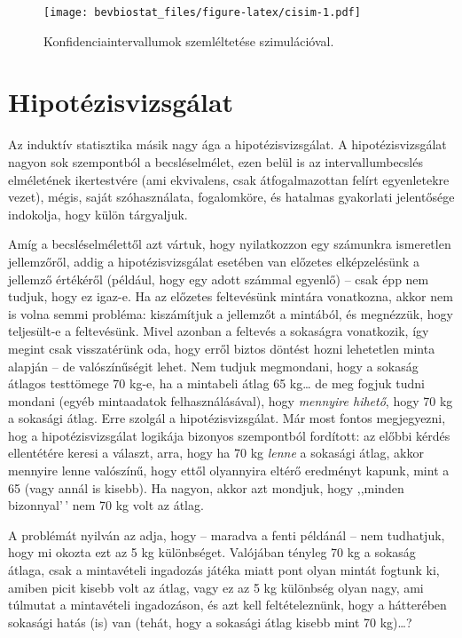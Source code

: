 \documentclass[
]{book}
\begin{document}
\begin{figure}
\centering
\texttt{[image: bevbiostat\_files/figure-latex/cisim-1.pdf]}
\caption{\label{fig:cisim}Konfidenciaintervallumok szemléltetése szimulációval.}
\end{figure}

\hypertarget{induktivhipotezisvizsgalat}{%
\section{Hipotézisvizsgálat}\label{induktivhipotezisvizsgalat}}

Az induktív statisztika másik nagy ága a hipotézisvizsgálat. A hipotézisvizsgálat nagyon sok szempontból a becsléselmélet, ezen belül is az intervallumbecslés elméletének ikertestvére (ami ekvivalens, csak átfogalmazottan felírt egyenletekre vezet), mégis, saját szóhasználata, fogalomköre, és hatalmas gyakorlati jelentősége indokolja, hogy külön tárgyaljuk.

Amíg a becsléselmélettől azt vártuk, hogy nyilatkozzon egy számunkra ismeretlen jellemzőről, addig a hipotézisvizsgálat esetében van előzetes elképzelésünk a jellemző értékéről (például, hogy egy adott számmal egyenlő) -- csak épp nem tudjuk, hogy ez igaz-e. Ha az előzetes feltevésünk mintára vonatkozna, akkor nem is volna semmi probléma: kiszámítjuk a jellemzőt a mintából, és megnézzük, hogy teljesült-e a feltevésünk. Mivel azonban a feltevés a sokaságra vonatkozik, így megint csak visszatérünk oda, hogy erről biztos döntést hozni lehetetlen minta alapján -- de valószínűségit lehet. Nem tudjuk megmondani, hogy a sokaság átlagos testtömege 70 kg-e, ha a mintabeli átlag 65 kg\dots{} de meg fogjuk tudni mondani (egyéb mintaadatok felhasználásával), hogy \emph{mennyire hihető}, hogy 70 kg a sokasági átlag. Erre szolgál a hipotézisvizsgálat. Már most fontos megjegyezni, hog a hipotézisvizsgálat logikája bizonyos szempontból fordított: az előbbi kérdés ellentétére keresi a választ, arra, hogy ha 70 kg \emph{lenne} a sokasági átlag, akkor mennyire lenne valószínű, hogy ettől olyannyira eltérő eredményt kapunk, mint a 65 (vagy annál is kisebb). Ha nagyon, akkor azt mondjuk, hogy ,,minden bizonnyal'\,' nem 70 kg volt az átlag.

A problémát nyilván az adja, hogy -- maradva a fenti példánál -- nem tudhatjuk, hogy mi okozta ezt az 5 kg különbséget. Valójában tényleg 70 kg a sokaság átlaga, csak a mintavételi ingadozás játéka miatt pont olyan mintát fogtunk ki, amiben picit kisebb volt az átlag, vagy ez az 5 kg különbség olyan nagy, ami túlmutat a mintavételi ingadozáson, és azt kell feltételeznünk, hogy a hátterében sokasági hatás (is) van (tehát, hogy a sokasági átlag kisebb mint 70 kg)\dots{}?
\end{document}
